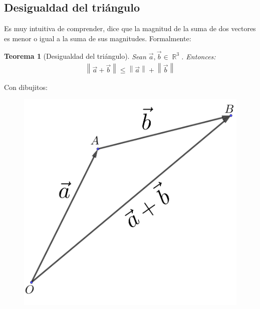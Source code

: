 \documentclass[12pt, fleqn]{report}                             %
\newtheorem{Theorem}{Teorema}[section]                          %
\theoremstyle{break}                                            %
\DeclareMathOperator \Reals        {\mathbb{R}}                 %
\newcommand{\Abs}[1]{\left\lVert #1 \right\lVert}               %
\begin{document}
            
            \clearpage
            
            \subsection{Desigualdad del triángulo}
            
            Es muy intuitiva de comprender, dice que la magnitud de la suma de dos vectores es menor o igual a la suma de sus magnitudes. Formalmente:
            
            \begin{Theorem}[Desigualdad del triángulo]
                Sean $\vec{a}, \vec{b} \in \Reals^3$. Entonces:
                \begin{align}
                    \Abs{\vec{a}+\vec{b}} \leq \Abs{\vec{a}} + \Abs{\vec{b}} \label{triangleInequality}
                \end{align}
            \end{Theorem}
        
            Con dibujitos:
            \begin{figure}[H]
                \centering
                \includegraphics[scale=1]{triangleInequality.png}
            \end{figure}
        
\end{document}
